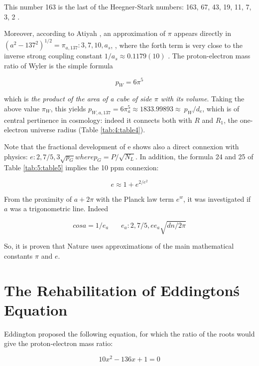 \documentclass[a4paper,9pt]{article}
\begin{document}
This number 163 is the last of the Heegner-Stark numbers: 163, 67, 43, 19, 11, 7, 3, 2 \cite{Stark}. 


Moreover, according to Atiyah \cite{Atiyah1}, an approximation of $\pi$ appears directly in $(a^2-137^2)^{1/2} = \pi_{a,137} : 3, 7, 10, a_s$, , where the forth term is very close to the inverse strong coupling constant $1/a_s \approx 0.1179(10)$ \cite{Tanabashi}. The proton-electron mass ratio of Wyler \cite{Wyler} is the simple formula 

\begin{equation}
 p_W = 6\pi^5    
\end{equation}

which is \textit {the product of the area of a cube of side $\pi$ with its volume}. Taking the above value $\pi_W$, this yields $p_{W, a, 137} = 6\pi_a^5 \approx 1833.99893 \approx\ p_W/d_e$, which is of central pertinence in cosmology: indeed it connects both with $R$ and $R_1$, the one-electron universe radius \cite{Sanchez} (Table \ref{tab:4:table4}).

Note that the fractional development of e shows also a direct connexion with physics: $e : 2, 7/5, 3\sqrt{p_G} where p_G = P/\sqrt {N_L}$. In addition, the formula 24 and 25 of Table \ref{tab:5:table5} implies the 10 ppm connexion:

\begin{equation}
 e \approx 1 + e^{2/e^2}    
\end{equation}

From the proximity of $a + 2\pi$ with the Planck law term $e^w$, it was investigated if $a$ was a trigonometric line. Indeed 
 
\begin{equation}
cosa = 1/e_a ~~~~~~~~  e_a : 2, 7/5, ee_a \sqrt{dn/2\pi} 
\end{equation}

So, it is proven that Nature uses approximations of the main mathematical constants $\pi$ and $e$.








\section{The Rehabilitation of Eddington\'s Equation}
Eddington proposed the following equation, for which the ratio of the roots would give the proton-electron mass ratio:

\begin{equation}
 10x^2 - 136x +1 = 0     
\end{equation}
\end{document}
